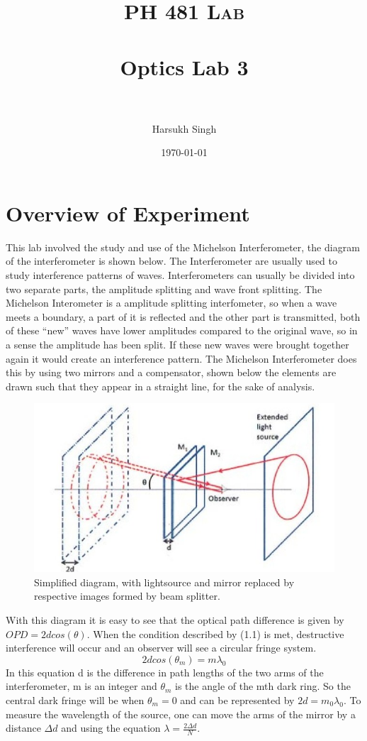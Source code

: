 \documentclass[paper=a4, fontsize=11pt]{scrartcl} %
\title{	
\normalfont \normalsize 
\textsc{PH 481 Lab} \\ [25pt] %
\horrule{2pt} \\[0.5cm] %
\huge Optics Lab 3\\ %
\horrule{2pt} \\[0.5cm] %
}
\author{Harsukh Singh} %
\date{\normalsize \today} %
\numberwithin{equation}{section} %
\numberwithin{figure}{section} %
\numberwithin{table}{section} %
\begin{document}
\maketitle %
\section{Overview of Experiment}
This lab involved the study and use of the Michelson Interferometer, the diagram of the interferometer is shown below.  The Interferometer are usually used to study interference patterns of waves. Interferometers can usually be divided into two separate parts, the amplitude splitting and wave front splitting. The Michelson Interometer is a amplitude splitting interfometer, so when a wave meets a boundary, a part of it is reflected and the other part is transmitted, both of these ``new'' waves have lower amplitudes compared to the original wave, so in a sense the amplitude has been split. If  these new waves were brought together again it would create an interference pattern. The Michelson Interferometer does this by using two mirrors and a compensator, shown below the elements are drawn such that they appear in a straight line, for the sake of analysis. 
\begin{figure}[htb]
	\caption{Simplified diagram, with lightsource and mirror replaced by respective images formed by beam splitter.}
		\begin{center}
			\includegraphics[height=3.5 cm, width= 6 cm]{michelson}
		\end{center}
\end{figure}

With this diagram it is easy to see that the optical path difference is given by $ OPD = 2dcos(\theta)$. When the condition described by (1.1) is met, destructive interference will occur and an observer will see a circular fringe system. 
\begin{equation}
2dcos(\theta_m) = m\lambda_0 
\end{equation}
 In this equation d is the difference in path lengths of the two arms of the interferometer, m is an integer and $\theta_m$ is the angle of the mth dark ring. So the central dark fringe will be when $\theta_m = 0$ and can be represented by $2d =m_0\lambda_0$. To measure the wavelength of the source, one can move the arms of the mirror by a distance $\Delta d$ and using the equation $\lambda =\frac{ 2 \Delta d}{N}$. \\
\end{document}
